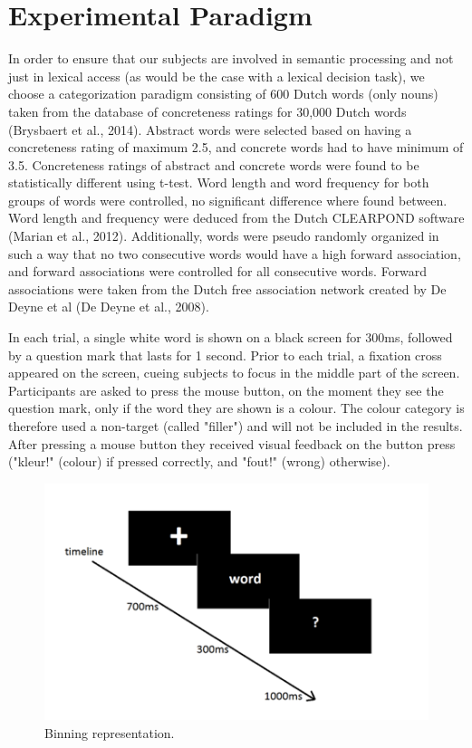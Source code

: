\section{Experimental Paradigm}

In order to ensure that our subjects are involved in semantic processing and not just in lexical access (as would be the case with a lexical decision task), we choose a categorization paradigm consisting of 600 Dutch words (only nouns) taken from the database of concreteness ratings for 30,000 Dutch words (Brysbaert et al., 2014). Abstract words were selected based on having a concreteness rating of maximum 2.5, and concrete words had to have minimum of 3.5. Concreteness ratings of abstract and concrete words were found to be statistically different using t-test. Word length and word frequency for both groups of words were controlled, no significant difference  where found between. Word length and frequency were deduced from the Dutch CLEARPOND software (Marian et al., 2012). Additionally, words were pseudo randomly organized in such a way that no two consecutive words would have a high forward association, and forward associations were controlled for all consecutive words. Forward associations were taken from the Dutch free association network created by De Deyne et al (De Deyne et al., 2008). 

In each trial, a single white word is shown on a black screen for 300ms, followed by a question mark that lasts for 1 second. Prior to each trial, a fixation cross appeared on the screen, cueing subjects to focus in the middle part of the screen. Participants are asked to press the mouse button, on the moment they see the question mark, only if the word they are shown is a colour. The colour category is therefore used a non-target (called "filler") and will not be included in the results. After pressing a mouse button they received visual feedback on the button press ("kleur!" (colour) if pressed correctly, and "fout!" (wrong) otherwise). 

\begin{figure}[!htb]
\caption{Binning representation.}
\label{entropy}
    \centering
    \includegraphics[width=\textwidth]{fig/experiment}
\end{figure}

